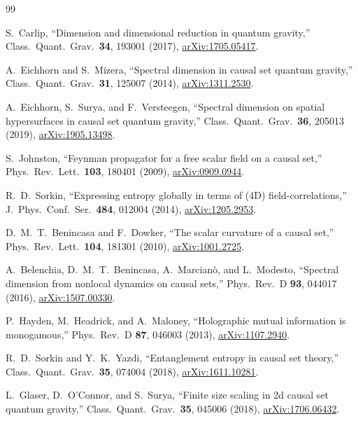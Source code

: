 \documentclass[aps,prd,twocolumn,superscriptaddress,nofootinbib]{revtex4-2}
\begin{document}
\begin{thebibliography}{99}

S.~Carlip,
``Dimension and dimensional reduction in quantum gravity,''
Class.\ Quant.\ Grav.\ \textbf{34}, 193001 (2017),
\href{https://arxiv.org/abs/1705.05417}{arXiv:1705.05417}.

A.~Eichhorn and S.~Mizera,
``Spectral dimension in causal set quantum gravity,''
Class.\ Quant.\ Grav.\ \textbf{31}, 125007 (2014),
\href{https://arxiv.org/abs/1311.2530}{arXiv:1311.2530}.

A.~Eichhorn, S.~Surya, and F.~Versteegen,
``Spectral dimension on spatial hypersurfaces in causal set quantum gravity,''
Class.\ Quant.\ Grav.\ \textbf{36}, 205013 (2019),
\href{https://arxiv.org/abs/1905.13498}{arXiv:1905.13498}.

S.~Johnston,
``Feynman propagator for a free scalar field on a causal set,''
Phys.\ Rev.\ Lett.\ \textbf{103}, 180401 (2009),
\href{https://arxiv.org/abs/0909.0944}{arXiv:0909.0944}.

R.~D.~Sorkin,
``Expressing entropy globally in terms of (4D) field-correlations,''
J.\ Phys.\ Conf.\ Ser.\ \textbf{484}, 012004 (2014),
\href{https://arxiv.org/abs/1205.2953}{arXiv:1205.2953}.

D.~M.~T.~Benincasa and F.~Dowker,
``The scalar curvature of a causal set,''
Phys.\ Rev.\ Lett.\ \textbf{104}, 181301 (2010),
\href{https://arxiv.org/abs/1001.2725}{arXiv:1001.2725}.

A.~Belenchia, D.~M.~T.~Benincasa, A.~Marcian\`o, and L.~Modesto,
``Spectral dimension from nonlocal dynamics on causal sets,''
Phys.\ Rev.\ D \textbf{93}, 044017 (2016),
\href{https://arxiv.org/abs/1507.00330}{arXiv:1507.00330}.

P.~Hayden, M.~Headrick, and A.~Maloney,
``Holographic mutual information is monogamous,''
Phys.\ Rev.\ D \textbf{87}, 046003 (2013),
\href{https://arxiv.org/abs/1107.2940}{arXiv:1107.2940}.

R.~D.~Sorkin and Y.~K.~Yazdi,
``Entanglement entropy in causal set theory,''
Class.\ Quant.\ Grav.\ \textbf{35}, 074004 (2018),
\href{https://arxiv.org/abs/1611.10281}{arXiv:1611.10281}.

L.~Glaser, D.~O'Connor, and S.~Surya,
``Finite size scaling in 2d causal set quantum gravity,''
Class.\ Quant.\ Grav.\ \textbf{35}, 045006 (2018),
\href{https://arxiv.org/abs/1706.06432}{arXiv:1706.06432}.


\end{thebibliography}
\end{document}
